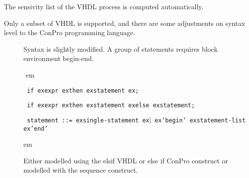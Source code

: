\documentclass[a4paper,12pt,twoside,english]{article}
\def\s{\hskip 1.15 ex}
\begin{document}
\begin{description}
\begin{description}
\end{description}
The sensivity list of the VHDL process is computed automatically.


\item[\colorit{\bf VHDL Subset}] $ $\\
Only a subset of VHDL is supported, and there are some adjustments on syntax level to the ConPro programming language.


\begin{description}
\item[] $ $\\
Syntax is slightly modified. A group of statements requires block environment begin-end. 

\def\prefskipu{}\def\prefskipo{}\def\prefskipa{}\def\prefskipu{\hskip10pt}\def\prefskipo{\hskip10pt}\def\prefskipa{\hskip30pt}\def\content{
\vskip-5pt{\parindent0pt\parbox{\linewidth}{\tt\smallsize\hskip10pt if\s expr\s then\s statement\s ;}}
\vskip-5pt{\parindent0pt\parbox{\linewidth}{\tt\smallsize\hskip10pt if\s expr\s then\s statement\s else\s statement;}}
\vskip-5pt{\parindent0pt\parbox{\linewidth}{\tt\smallsize\hskip10pt statement~::=\s single-statement\s $|$\s 'begin'\s statement-list\s 'end'}}
}
$ $
 em
\content
{} em
\item[] $ $\\
Either modelled using the elsif VHDL or else if ConPro construct or modelled with the sequence construct. 


\end{description}
\end{description}
\end{document}

